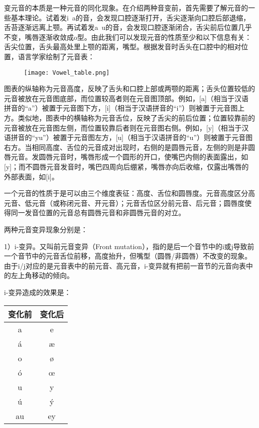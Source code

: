 变元音的本质是一种元音的同化现象。在介绍两种音变前，首先需要了解元音的一些基本理论。试着发i~a的音，会发现口腔逐渐打开，舌尖逐渐向口腔后部退缩，舌苔逐渐远离上颚。再试着发a~u的音，会发现口腔逐渐闭合，舌尖前后位置几乎不变，嘴唇逐渐收敛成o型。由此我们可以发现元音的性质至少和以下信息有关：舌尖位置，舌头最高处里上颚的距离，嘴型。根据发音时舌头在口腔中的相对位置，语言学家绘制了元音表：

\begin{figure}[H]
  \centering
  \texttt{[image: Vowel\_table.png]}
\end{figure}

图表的纵轴称为元音高度，反映了舌头和口腔上部或两颚的距离；舌头位置较低的元音被放在元音图底部，而位置较高者则在元音图顶部。例如，{[}a{]}（相当于汉语拼音的``a''）被置于元音图下方，{[}i{]}（相当于汉语拼音的``i''）则被置于元音图上方。类似地，图表中的横轴称为元音舌位，反映了舌尖的前后位置；位置较靠前的元音被放在元音图左侧，而位置较靠后者则在元音图右侧。例如，{[}y{]}（相当于汉语拼音的``yu''）被置于元音图左方，{[}u{]}（相当于汉语拼音的``u''）则被置于元音图右方。当相同高度、舌位的元音成对出现时，右侧的是圆唇元音，左侧的则是非圆唇元音。发圆唇元音时，嘴唇形成一个圆形的开口，使嘴巴内侧的表面露出，如{[}y{]}；而不圆唇元音发音时，嘴巴四周向后绷紧，嘴唇亦向后收缩，仅露出嘴唇的外部表面，如{[}i{]}。

一个元音的性质于是可以由三个维度表征：高度、舌位和圆唇度。元音高度区分高元音、低元音（或称闭元音、开元音）；元音舌位区分前元音、后元音；圆唇度使得同一发音位置的元音总有圆唇元音和非圆唇元音的对立。

两种元音变异现象分别是：

1）i-变异。又叫前元音变异（Front mutation），指的是后一个音节中的i或j导致前一个音节中的元音舌位前移，高度抬升，但嘴型（圆唇/非圆唇）不改变的现象。由于i/j对应的是元音表中的前元音、高元音，i-变异就有把前一音节的元音向表中的左上角移动的倾向。

i-变异造成的效果是：
\begin{table}[H]
  \centering
  \begin{tabular}{cc}
    \toprule
    \textbf{变化前} & \textbf{变化后} \\ \midrule
    a            & e            \\
    á            & æ            \\
    o            & ø            \\
    ó            & œ            \\
    u            & y            \\
    ú            & ý            \\
    au           & ey           \\ \bottomrule
  \end{tabular}
\end{table}


